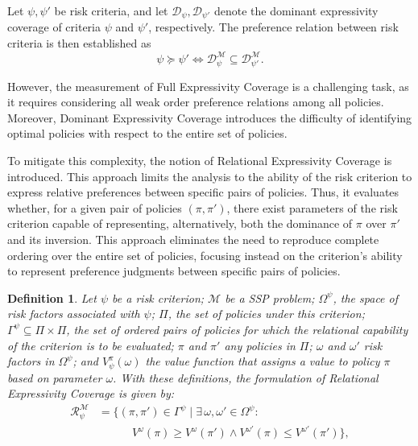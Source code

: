 \documentclass[runningheads]{llncs}
\newtheorem{definit}{Definition}
\begin{document}
\begin{definition}
    Let $\psi, \psi'$ be risk criteria, and let $\mathcal{D}_{\psi}, \mathcal{D}_{\psi'}$ denote the dominant expressivity coverage of criteria $\psi$ and $\psi'$, respectively. The preference relation between risk criteria is then established as
    \begin{equation}
        \psi \succeq \psi' \iff \mathcal{D}^{\mathcal{M}}_{\psi} \subseteq \mathcal{D}^{\mathcal{M}}_{\psi'}.
    \end{equation}
\end{definition}

However, the measurement of Full Expressivity Coverage is a challenging task, as it requires considering all weak order preference relations among all policies. Moreover, Dominant Expressivity Coverage introduces the difficulty of identifying optimal policies with respect to the entire set of policies.

To mitigate this complexity, the notion of Relational Expressivity Coverage is introduced. This approach limits the analysis to the ability of the risk criterion to express relative preferences between specific pairs of policies. Thus, it evaluates whether, for a given pair of policies $(\pi, \pi')$, there exist parameters of the risk criterion capable of representing, alternatively, both the dominance of $\pi$ over $\pi'$ and its inversion. This approach eliminates the need to reproduce complete ordering over the entire set of policies, focusing instead on the criterion's ability to represent preference judgments between specific pairs of policies.

\begin{definit}
    Let $\psi$ be a risk criterion; $\mathcal{M}$ be a SSP problem; $\Omega^{\psi}$, the space of risk factors associated with $\psi$; $\Pi$, the set of policies under this criterion; $\Gamma^{\psi} \subseteq \Pi \times \Pi$, the set of ordered pairs of policies for which the relational capability of the criterion is to be evaluated; $\pi$ and $\pi'$ any policies in $\Pi$; $\omega$ and $\omega'$ risk factors in $\Omega^{\psi}$; and $V_{\psi}^{\pi}(\omega)$ the value function that assigns a value to policy $\pi$ based on parameter $\omega$. With these definitions, the formulation of Relational Expressivity Coverage is given by:
    \begin{equation}
        \begin{aligned}
            \mathcal{R}^{\mathcal{M}}_\psi
            &= \bigl\{ 
                (\pi,\pi')\in \Gamma^{\psi} \;\big|\;
                \exists\, \omega, \omega' \in \Omega^{\psi}:
                \\
            &\hspace{3em}
                V^{\omega}(\pi) \geq V^{\omega}(\pi')
                \wedge
                V^{\omega'}(\pi) \leq V^{\omega'}(\pi')
            \bigr\},
        \end{aligned}
    \end{equation}
\end{definit}
\end{document}
